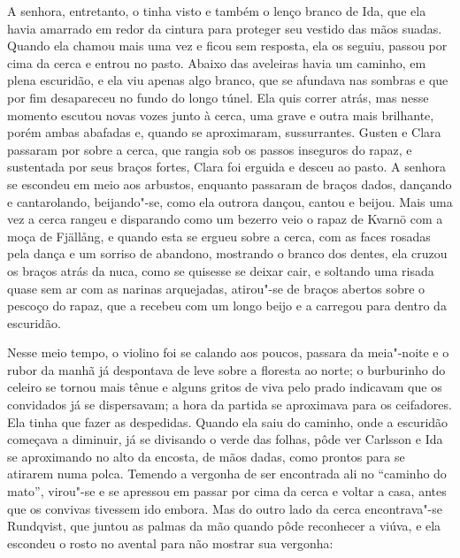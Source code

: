 A senhora, entretanto, o tinha visto e também o lenço branco de Ida, que ela
havia amarrado em redor da cintura para proteger seu vestido das mãos suadas.
Quando ela chamou mais uma vez e ficou sem resposta, ela os seguiu, passou por
cima da cerca e entrou no pasto. Abaixo das aveleiras havia um caminho, em plena
escuridão, e ela viu apenas algo branco, que se afundava nas sombras e que por fim
desapareceu no fundo do longo túnel. Ela quis correr atrás, mas nesse momento
escutou novas vozes junto à cerca, uma grave e outra mais brilhante, porém ambas
abafadas e, quando se aproximaram, sussurrantes. Gusten e Clara passaram por
sobre a cerca, que rangia sob os passos inseguros do rapaz, e sustentada por
seus braços fortes, Clara foi erguida e desceu ao pasto. A senhora se escondeu
em meio aos arbustos, enquanto passaram de braços dados, dançando e
cantarolando, beijando"-se, como ela outrora dançou, cantou e beijou. Mais uma
vez a cerca rangeu e disparando como um bezerro veio o rapaz de Kvarnö com a
moça de Fjällång, e quando esta se ergueu sobre a cerca, com as faces rosadas
pela dança e um sorriso de abandono, mostrando o branco dos dentes, ela cruzou
os braços atrás da nuca, como se quisesse se deixar cair, e soltando uma risada
quase sem ar com as narinas arquejadas, atirou"-se de braços abertos sobre o
pescoço do rapaz, que a recebeu com um longo beijo e a carregou para dentro da
escuridão.


Nesse meio tempo, o violino foi se calando aos poucos, passara da meia"-noite 
e o rubor da manhã já despontava de leve sobre a floresta ao norte;
o burburinho do celeiro se tornou mais tênue e alguns gritos de viva pelo prado
indicavam que os convidados já se dispersavam; a hora da partida se aproximava
para os ceifadores. Ela tinha que fazer as despedidas. Quando ela saiu do
caminho, onde a escuridão começava a diminuir, já se divisando o verde das
folhas, pôde ver Carlsson e Ida se aproximando no alto da encosta, de mãos dadas,
como prontos para se atirarem numa polca. Temendo a vergonha de ser encontrada
ali no ``caminho do mato'', virou"-se e se apressou em passar por cima da cerca e
voltar a casa, antes que os convivas tivessem ido embora. Mas do outro lado da
cerca encontrava"-se Rundqvist, que juntou as palmas da mão quando pôde
reconhecer a viúva, e ela escondeu o rosto no avental para não mostrar sua
vergonha:

